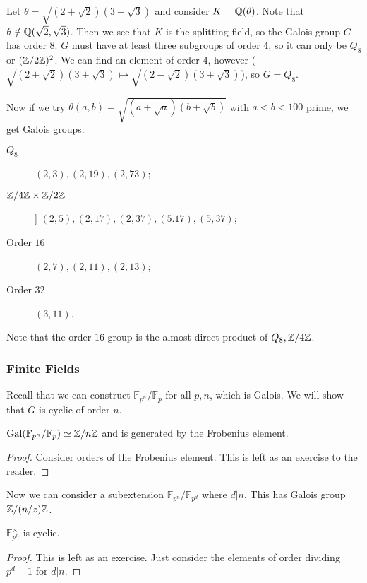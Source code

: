 \documentclass[10pt, twoside]{article}
\newcommand{\F}{\mathbb{F}}
\begin{document}
        \begin{exm}
            Let $\theta = \sqrt{(2+\sqrt{2})(3+\sqrt{3})}$ and consider $K = \mathbb{Q}(\theta)$. Note that $\theta \notin \mathbb{Q}(\sqrt{2}, \sqrt{3})$.  Then we see that $K$ is the splitting field, so the Galois group $G$ has order $8$. $G$ must have at least three subgroups of order $4$, so it can only be $Q_8$ or $(\mathbb{Z}/2\mathbb{Z})^2$. We can find an element of order $4$, however ($\sqrt{(2 + \sqrt{2})(3 + \sqrt{3})} \mapsto \sqrt{(2 - \sqrt{2})(3 + \sqrt{3})}$), so $G = Q_8$.
        \end{exm}

        Now if we try $\theta(a,b) = \sqrt{(a + \sqrt{a})(b + \sqrt{b})}$ with $a < b < 100$ prime, we get Galois groups:
        \begin{description}
            \item[$Q_8$] $(2,3), (2,19), (2,73)$;
            \item[$\mathbb{Z}/4\mathbb{Z} \times \mathbb{Z}/2\mathbb{Z}$]] $(2,5), (2,17), (2,37), (5.17), (5,37)$;
            \item[Order $16$] $(2,7), (2,11), (2,13)$;
            \item[Order $32$] $(3,11)$.
        \end{description}

        Note that the order $16$ group is the almost direct product of $Q_8, \mathbb{Z}/4\mathbb{Z}$. 

        \subsubsection{Finite Fields}
        Recall that we can construct $\F_{p^n}/\F_p$ for all $p,n$, which is Galois. We will show that $G$ is cyclic of order $n$.

        \begin{prop}
            $\mathrm{Gal}(\F_{p^n}/\F_p) \simeq \Z/n\Z$ and is generated by the Frobenius element.
            \begin{proof}
                Consider orders of the Frobenius element. This is left as an exercise to the reader.
            \end{proof}
        \end{prop}
        
        Now we can consider a subextension $\F_{p^n}/\F_{p^d}$ where $d | n$. This has Galois group $\mathbb{Z}/(n/z)\mathbb{Z}$.

        \begin{prop}
            $\F_{p^n}^{\times}$ is cyclic.
            \begin{proof}
                This is left as an exercise. Just consider the elements of order dividing $p^d-1$ for $d | n$.
            \end{proof}
        \end{prop}
\end{document}
